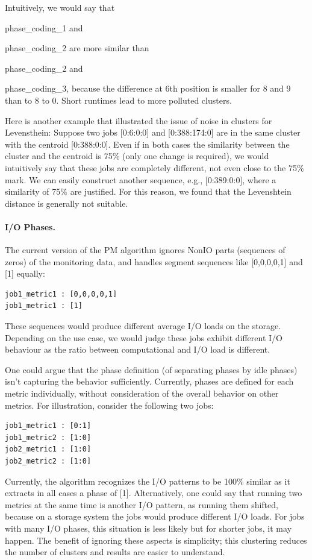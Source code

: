 \documentclass{jhps}
\begin{document}
Intuitively, we would say that {phase\_coding\_1 and{ phase\_coding\_2 are more similar than {phase\_coding\_2 and {phase\_coding\_3, because the difference at 6th position is smaller for 8 and 9 than to 8 to 0.
Short runtimes lead to more polluted clusters.

Here is another example that illustrated the issue of noise in clusters for Levensthein:
Suppose two jobs [0:6:0:0] and [0:388:174:0] are in the same cluster with the centroid [0:388:0:0].
Even if in both cases the similarity between the cluster and the centroid is 75$\%$  (only one change is required), we would intuitively say that these jobs are completely different, not even close to the 75$\%$  mark.
We can easily construct another sequence, e.g., [0:389:0:0], where a similarity of 75$\%$  are justified.
For this reason, we found that the Levenshtein distance is generally not suitable.

\paragraph{I/O Phases.}
The current version of the PM algorithm ignores NonIO parts (sequences of zeros) of the monitoring data, and  handles segment sequences like [0,0,0,0,1] and [1] equally:
\begin{lstlisting}
job1_metric1 : [0,0,0,0,1]
job1_metric1 : [1]
\end{lstlisting}

These sequences would produce different average I/O loads on the storage.
Depending on the use case, we would judge these jobs exhibit different I/O behaviour as the ratio between computational and I/O load is different.

One could argue that the phase definition (of separating phases by idle phases) isn't capturing the behavior sufficiently.
Currently, phases are defined for each metric individually, without consideration of the overall behavior on  other metrics.
For illustration, consider the following two jobs:
\begin{lstlisting}
job1_metric1 : [0:1]
job1_metric2 : [1:0]
job2_metric1 : [1:0]
job2_metric2 : [1:0]
\end{lstlisting}

Currently, the algorithm recognizes the I/O patterns to be 100$\%$ similar as it extracts in all cases a phase of [1].
Alternatively, one could say that running two metrics at the same time is another I/O pattern, as running them shifted, because on a storage system the jobs would produce different I/O loads.
For jobs with many I/O phases, this situation is less likely but for shorter jobs, it may happen.
The benefit of ignoring these aspects is simplicity; this clustering reduces the number of clusters and  results are easier to understand.

}}}}
\end{document}
